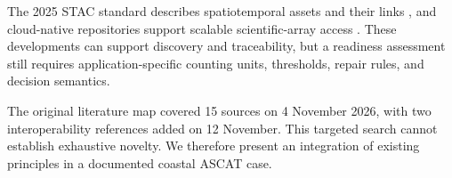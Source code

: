 The 2025 STAC standard describes spatiotemporal assets and their links \cite{stac2025}, and cloud-native repositories support scalable scientific-array access \cite{abernathey2021}. These developments can support discovery and traceability, but a readiness assessment still requires application-specific counting units, thresholds, repair rules, and decision semantics.

The original literature map covered 15 sources on 4 November 2026, with two interoperability references added on 12 November. This targeted search cannot establish exhaustive novelty. We therefore present an integration of existing principles in a documented coastal ASCAT case.
